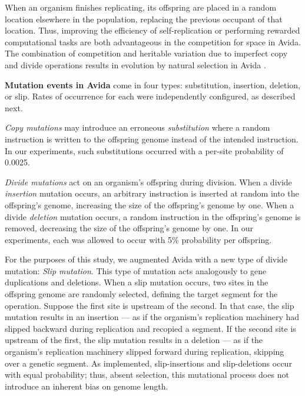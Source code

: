 When an organism finishes replicating, its offspring are placed in a random location elsewhere in the population, replacing the previous occupant of that location.
Thus, improving the efficiency of self-replication or performing rewarded computational tasks are both advantageous in the competition for space in Avida. The combination of competition and heritable variation due to imperfect copy and divide operations results in evolution by natural selection in Avida \citep{pennock2007models}.



\textbf{Mutation events in Avida} come in four types: substitution, insertion, deletion, or slip.
Rates of occurrence for each were independently configured, as described next.

\textit{Copy mutations} may introduce an erroneous \textit{substitution} where a random instruction is written to the offspring genome instead of the intended instruction.
In our experiments, such substitutions occurred with a per-site probability of 0.0025.

\textit{Divide mutations} act on an organism's offspring during division.
When a divide \textit{insertion} mutation occurs, an arbitrary instruction is inserted at random into the offspring's genome, increasing the size of the offspring's genome by one.
When a divide \textit{deletion} mutation occurs, a random instruction in the offspring's genome is removed, decreasing the size of the offspring's genome by one.
In our experiments, each was allowed to occur with 5\% probability per offspring.

For the purposes of this study, we augmented Avida with a new type of divide mutation: \textit{Slip mutation}.
This type of mutation acts analogously to gene duplications and deletions.
When a slip mutation occurs, two sites in the offspring genome are randomly selected, defining the target segment for the operation.
Suppose the first site is upstream of the second.
In that case, the slip mutation results in an insertion --- as if the organism's replication machinery had slipped backward during replication and recopied a segment.
If the second site is upstream of the first, the slip mutation results in a deletion --- as if the organism's replication machinery slipped forward during replication, skipping over a genetic segment.
As implemented, slip-insertions and slip-deletions occur with equal probability; thus, absent selection, this mutational process does not introduce an inherent bias on genome length.

